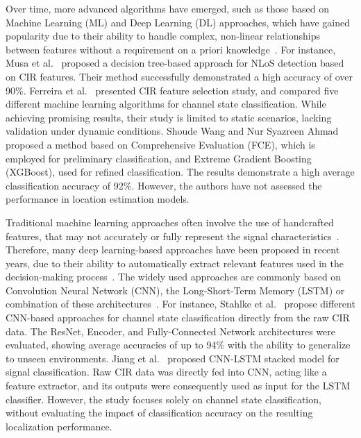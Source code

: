 Over time, more advanced algorithms have emerged, such as those based on Machine Learning (ML) and Deep Learning (DL) approaches, which have gained popularity due to their ability to handle complex, non-linear relationships between features without a requirement on a priori knowledge~\cite{yu2018novel, pei2024fcn}. For instance, Musa et al.~\cite{musa2019decision} proposed a decision tree-based approach for NLoS detection based on CIR features. Their method successfully demonstrated a high accuracy of over 90\%. Ferreira et al.~\cite{ferreira2021feature} presented CIR feature selection study, and compared five different machine learning algorithms for channel state classification. While achieving promising results, their study is limited to static scenarios, lacking validation under dynamic conditions. Shoude Wang and Nur Syazreen Ahmad~\cite{wang2024robust} proposed a method based on Comprehensive Evaluation (FCE), which is employed for preliminary classification, and Extreme Gradient Boosting (XGBoost), used for refined classification. The results demonstrate a high average classification accuracy of 92\%. However, the authors have not assessed the performance in location estimation models.

Traditional machine learning approaches often involve the use of handcrafted features, that may not accurately or fully represent the signal characteristics~\cite{abbasi2021novel}. Therefore, many deep learning-based approaches have been proposed in recent years, due to their ability to automatically extract relevant features used in the decision-making process~\cite{shaheen2016impact}. The widely used approaches are commonly based on Convolution Neural Network (CNN), the Long-Short-Term Memory (LSTM) or combination of these architectures~\cite{pei2024fcn}. For instance, Stahlke et al.~\cite{stahlke2020nlos} propose different CNN-based approaches for channel state classification directly from the raw CIR data. The ResNet, Encoder, and Fully-Connected Network architectures were evaluated, showing average accuracies of up to 94\% with the ability to generalize to unseen environments. Jiang et al.~\cite{jiang2020uwb} proposed CNN-LSTM stacked model for signal classification. Raw CIR data was directly fed into CNN, acting like a feature extractor, and its outputs were consequently used as input for the LSTM classifier. However, the study focuses solely on channel state classification, without evaluating the impact of classification accuracy on the resulting localization performance.

